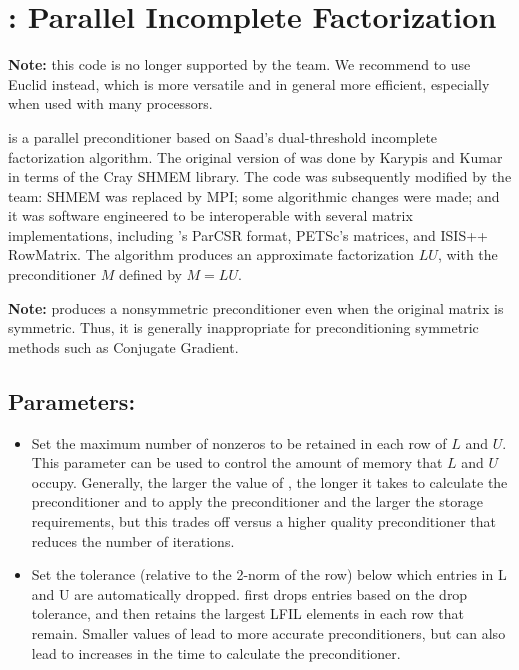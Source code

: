 
\section{\pilut: Parallel Incomplete Factorization}
\label{PILUT}

{\bf Note:} this code is no longer supported by the \hypre{} team. We recommend to 
use Euclid instead, which is more versatile and in general more efficient, especially
when used with many processors.

\vspace{.3in}
\pilut{} is a parallel preconditioner based on Saad's dual-threshold incomplete
factorization algorithm. The original version of \pilut{} was done by Karypis
and Kumar \cite{GKarypis_VKumar_1998} in terms of the Cray SHMEM library. The
code was subsequently modified by the \hypre{} team: SHMEM was replaced by MPI;
some algorithmic changes were made; and it was software engineered to be
interoperable with several matrix implementations, including \hypre{}'s ParCSR
format, PETSc's matrices, and ISIS++ RowMatrix. The algorithm produces an
approximate factorization $ L U$, with the preconditioner $M$ defined by $ M =
L U $.

{\bf Note:} \pilut{} produces a nonsymmetric preconditioner even when the
original matrix is symmetric. Thus, it is generally inappropriate for
preconditioning symmetric methods such as Conjugate Gradient.


\subsection*{Parameters:}

\begin{itemize}

\item
{}
Set the maximum number of nonzeros to be retained in each row of $L$ and $U$.
This parameter can be used to control the amount of memory that $L$ and $U$
occupy. Generally, the larger the value of , the longer it takes to
calculate the preconditioner and to apply the preconditioner and the larger
the storage requirements, but this trades
off versus a higher quality preconditioner that reduces the number of
iterations.

\item
{}
Set the tolerance (relative to the 2-norm of the row) below which entries in L
and U are automatically dropped. \pilut{} first drops entries based on the drop
tolerance, and then retains the largest LFIL elements in each row that remain.
Smaller values of  lead to more accurate preconditioners, but can
also lead to increases in the time to calculate the preconditioner.

\end{itemize}


